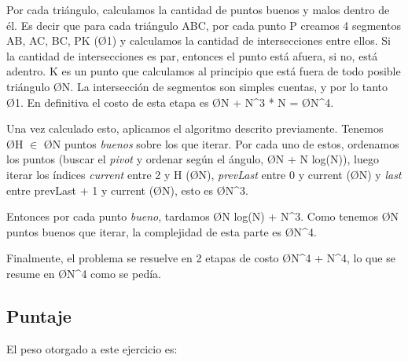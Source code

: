 Por cada triángulo, calculamos la cantidad de puntos buenos y malos dentro de él. Es decir que para cada triángulo ABC, por cada punto P creamos 4 segmentos AB, AC, BC, PK (\O{1}) y calculamos la cantidad de intersecciones entre ellos. Si la cantidad de intersecciones es par, entonces el punto está afuera, si no, está adentro. K es un punto que calculamos al principio que está fuera de todo posible triángulo \O{N}. La intersección de segmentos son simples cuentas, y por lo tanto \O{1}. En definitiva el costo de esta etapa es \O{N + N^3 * N} = \O{N^4}.

Una vez calculado esto, aplicamos el algoritmo descrito previamente. Tenemos \O{H} $\in$ \O{N} puntos \textit{buenos} sobre los que iterar. Por cada uno de estos, ordenamos los puntos (buscar el \textit{pivot} y ordenar según el ángulo, \O{N + N log(N)}), luego iterar los índices \textit{current} entre 2 y H (\O{N}), \textit{prevLast} entre 0 y current (\O{N}) y \textit{last} entre prevLast + 1 y current (\O{N}), esto es \O{N^3}.

Entonces por cada punto \textit{bueno}, tardamos \O{N log(N) + N^3}. Como tenemos \O{N} puntos buenos que iterar, la complejidad de esta parte es \O{N^4}.

Finalmente, el problema se resuelve en 2 etapas de costo \O{N^4 + N^4}, lo que se resume en \O{N^4} como se pedía.

\subsection{Puntaje}
El peso otorgado a este ejercicio es:
